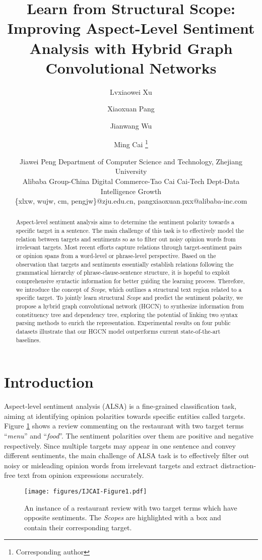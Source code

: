 \documentclass{article}
\title{Learn from Structural Scope: Improving Aspect-Level Sentiment Analysis with Hybrid Graph Convolutional Networks}
\author{
Lvxiaowei Xu
\and
Xiaoxuan Pang\and
Jianwang Wu\and
Ming Cai \footnote{ Corresponding author}\and
Jiawei Peng
\affiliations
Department of Computer Science and Technology, Zhejiang University\\
Alibaba Group-China Digital Commerce-Tao Cai Cai-Tech Dept-Data Intelligence Growth\\
\emails
\{xlxw, wujw, cm, pengjw\}@zju.edu.cn,
pangxiaoxuan.pxx@alibaba-inc.com
}
\begin{document}
\maketitle

\begin{abstract}
Aspect-level sentiment analysis aims to determine the sentiment polarity towards a specific target in a sentence. The main challenge of this task is to effectively model the relation between targets and sentiments so as to filter out noisy opinion words from irrelevant targets. Most recent efforts capture relations through target-sentiment pairs or opinion spans from a word-level or phrase-level perspective. Based on the observation that targets and sentiments essentially establish relations following the grammatical hierarchy of phrase-clause-sentence structure, it is hopeful to exploit comprehensive syntactic information for better guiding the learning process. Therefore, we introduce the concept of \emph{Scope}, which outlines a structural text region related to a specific target. To jointly learn structural \emph{Scope} and predict the sentiment polarity, we propose a hybrid graph convolutional network (HGCN) to synthesize information from constituency tree and dependency tree, exploring the potential of linking two syntax parsing methods to enrich the representation. Experimental results on four public datasets illustrate that our HGCN model outperforms current state-of-the-art baselines.
\end{abstract}

\section{Introduction}
Aspect-level sentiment analysis (ALSA) is a fine-grained classification task, aiming at identifying opinion polarities towards specific entities called targets. Figure \ref{fig1} shows a review commenting on the restaurant with two target terms ``\emph{menu}'' and ``\emph{food}''. The sentiment polarities over them are positive and negative respectively. Since multiple targets may appear in one sentence and convey different sentiments, the main challenge of ALSA task is to effectively filter out noisy or misleading opinion words from irrelevant targets and extract distraction-free text from opinion expressions accurately.
\begin{figure}[t]
	\centering
	\texttt{[image: figures/IJCAI-Figure1.pdf]} 
	\caption{An instance of a restaurant review with two target terms which have opposite sentiments. The \emph{Scopes} are highlighted with a box and contain their corresponding target.}
	\label{fig1}
\end{figure}
\end{document}
